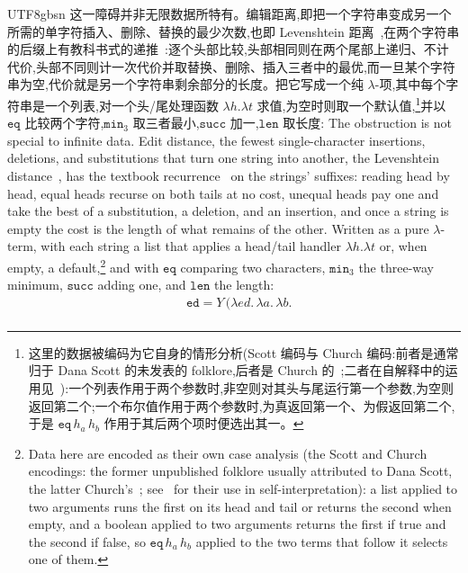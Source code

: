 \begin{CJK*}{UTF8}{gbsn}
  \ifPaperChinese
  这一障碍并非无限数据所特有。编辑距离,即把一个字符串变成另一个所需的单字符插入、删除、替换的最少次数,也即 Levenshtein 距离~\cite{levenshtein1966-binary-codes},在两个字符串的后缀上有教科书式的递推~\cite{wagner1974-string-correction}:逐个头部比较,头部相同则在两个尾部上递归、不计代价,头部不同则计一次代价并取替换、删除、插入三者中的最优,而一旦某个字符串为空,代价就是另一个字符串剩余部分的长度。把它写成一个纯 $\lambda$-项,其中每个字符串是一个列表,对一个头/尾处理函数 $\lambda h.\lambda t$ 求值,为空时则取一个默认值,\footnote{这里的数据被编码为它自身的情形分析(Scott 编码与 Church 编码:前者是通常归于 Dana Scott 的未发表的 folklore,后者是 Church 的~\cite{church1941-calculi};二者在自解释中的运用见~\cite{mogensen1992-self-interpretation}):一个列表作用于两个参数时,非空则对其头与尾运行第一个参数,为空则返回第二个;一个布尔值作用于两个参数时,为真返回第一个、为假返回第二个,于是 $\mathtt{eq}\,h_a\,h_b$ 作用于其后两个项时便选出其一。}并以 $\mathtt{eq}$ 比较两个字符,$\mathtt{min}_3$ 取三者最小,$\mathtt{succ}$ 加一,$\mathtt{len}$ 取长度:
  \else
  The obstruction is not special to infinite data. Edit distance, the fewest single-character insertions, deletions, and substitutions that turn one string into another, the Levenshtein distance~\cite{levenshtein1966-binary-codes}, has the textbook recurrence~\cite{wagner1974-string-correction} on the strings' suffixes: reading head by head, equal heads recurse on both tails at no cost, unequal heads pay one and take the best of a substitution, a deletion, and an insertion, and once a string is empty the cost is the length of what remains of the other. Written as a pure $\lambda$-term, with each string a list that applies a head/tail handler $\lambda h.\lambda t$ or, when empty, a default,\footnote{Data here are encoded as their own case analysis (the Scott and Church encodings: the former unpublished folklore usually attributed to Dana Scott, the latter Church's~\cite{church1941-calculi}; see~\cite{mogensen1992-self-interpretation} for their use in self-interpretation): a list applied to two arguments runs the first on its head and tail or returns the second when empty, and a boolean applied to two arguments returns the first if true and the second if false, so $\mathtt{eq}\,h_a\,h_b$ applied to the two terms that follow it selects one of them.} and with $\mathtt{eq}$ comparing two characters, $\mathtt{min}_3$ the three-way minimum, $\mathtt{succ}$ adding one, and $\mathtt{len}$ the length:
  \fi
  \[
    \begin{aligned}
      &\mathtt{ed} = Y\,\big(\lambda\mathit{ed}.\,\lambda a.\,\lambda b.\\

\end{aligned}\]
\end{CJK*}
